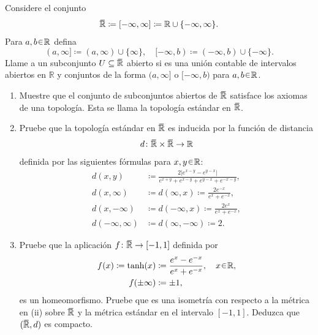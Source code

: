 \setcounter{neje}{12}
\begin{nejer}
Considere el conjunto
$$
\ubar{\mathbb{R}} \coloneq [-\infty, \infty] \coloneq \mathbb{R} \cup \{-\infty, \infty\}.
$$
Para $a, b \en \mathbb{R}$ defina
$$
(a, \infty] \coloneq (a, \infty) \cup \{\infty\}, \quad [-\infty, b) \coloneq (-\infty, b) \cup \{-\infty\}.
$$
Llame a un subconjunto $U \subseteq \ubar{\mathbb{R}}$ abierto si es una unión contable de intervalos abiertos en $\mathbb{R}$ y conjuntos de la forma $(a, \infty]$ o $[-\infty, b)$ para $a, b \en \mathbb{R}$.
\begin{enumerate}[label = (\roman*)]
\item Muestre que el conjunto de subconjuntos abiertos de $\ubar{\mathbb{R}}$ satisface los axiomas de una topología. Esta se llama la topología estándar en $\ubar{\mathbb{R}}$.

\item Pruebe que la topología estándar en $\ubar{\mathbb{R}}$ es inducida por la función de distancia
$$
d\colon \ubar{\mathbb{R}} \times \ubar{\mathbb{R}} \to \mathbb{R}
$$
definida por las siguientes fórmulas para $x, y \en \mathbb{R}$:
\begin{align*}
d(x, y) &\coloneq \frac{2|e^{x-y} - e^{y-x}|}{e^{x+y} + e^{x-y} + e^{y-x} + e^{-x-y}},\\
d(x, \infty) &\coloneq d(\infty, x) \coloneq \frac{2e^{-x}}{e^x + e^{-x}},\\
d(x, -\infty) &\coloneq d(-\infty, x) \coloneq \frac{2e^x}{e^x + e^{-x}},\\
d(-\infty, \infty) &\coloneq d(\infty, -\infty) \coloneq 2.
\end{align*}


\item Pruebe que la aplicación $f\colon \ubar{\mathbb{R}} \to [-1, 1]$ definida por
\begin{align*}
f(x) \coloneq \tanh(x) &\coloneq \frac{e^x - e^{-x}}{e^x + e^{-x}}, \quad x \en \mathbb{R},\\
f(\pm \infty) &\coloneq \pm 1,
\end{align*}
es un homeomorfismo. Pruebe que es una isometría con respecto a la métrica en (ii) sobre $\ubar{\mathbb{R}}$ y la métrica estándar en el intervalo $[-1, 1]$. Deduzca que $(\ubar{\mathbb{R}}, d)$ es compacto.
\end{enumerate}
\end{nejer}
